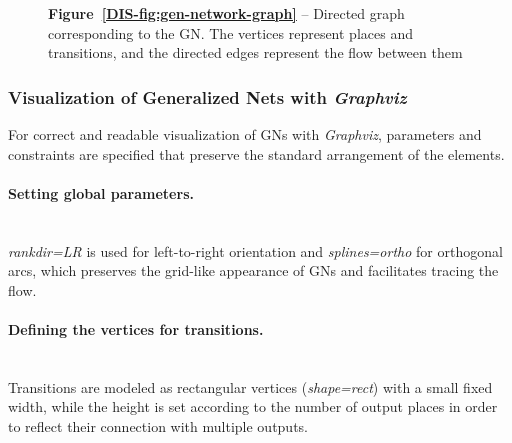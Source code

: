 \begin{figure}[H]
	\centering
	\begin{varwidth}{\textwidth}
		\centering
		\captionsetup{width=0.6\linewidth, justification=centering}
		\caption*{\textbf{Figure~\ref{DIS-fig:gen-network-graph}} -- Directed graph corresponding to the GN. The vertices represent places and transitions, and the directed edges represent the flow between them}

	\end{varwidth}
\end{figure}

\subsubsection{Visualization of Generalized Nets with \textit{Graphviz}}

\hspace*{2.5em}For correct and readable visualization of GNs with \textit{Graphviz}, parameters and constraints are specified that preserve the standard arrangement of the elements.

\paragraph{Setting global parameters.}
\mbox{}\\
\textit{rankdir=LR} is used for left-to-right orientation and \textit{splines=ortho} for orthogonal arcs, which preserves the grid-like appearance of GNs and facilitates tracing the flow.

\paragraph{Defining the vertices for transitions.}
\mbox{}\\
Transitions are modeled as rectangular vertices (\textit{shape=rect}) with a small fixed width, while the height is set according to the number of output places in order to reflect their connection with multiple outputs.

